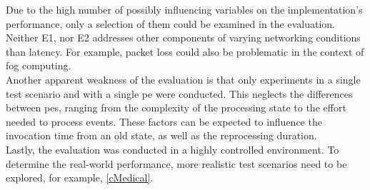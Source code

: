 Due to the high number of possibly influencing variables on the implementation's performance, only a selection of them could be examined in the evaluation.\\
Neither E1, nor E2 addresses other components of varying networking conditions than latency. For example, packet loss could also be problematic in the context of fog computing.\\
Another apparent weakness of the evaluation is that only experiments in a single test scenario and with a single \gls{pe} were conducted. This neglects the differences between \gls{pe}s, ranging from the complexity of the processing state to the effort needed to process events. These factors can be expected to influence the invocation time from an old state, as well as the reprocessing duration.\\
Lastly, the evaluation was conducted in a highly controlled environment. To determine the real-world performance, more realistic test scenarios need to be explored, for example, \ref{cMedical}.\par
